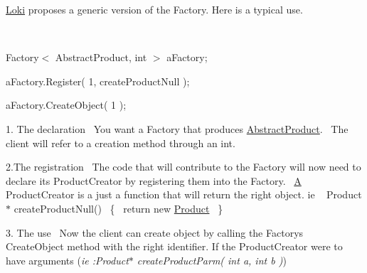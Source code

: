 \hyperlink{namespaceLoki}{Loki} proposes a generic version of the Factory. Here is a typical use.~\newline
 {\ttfamily ~\newline

\begin{DoxyEnumerate}
\item Factory$<$ Abstract\+Product, int $>$ a\+Factory;~\newline

\item a\+Factory.\+Register( 1, create\+Product\+Null );~\newline

\item a\+Factory.\+Create\+Object( 1 ); ~\newline
 ~\newline
 ~\newline

\end{DoxyEnumerate}
\begin{DoxyItemize}
\item 1. The declaration~\newline
 You want a Factory that produces \hyperlink{classAbstractProduct}{Abstract\+Product}.~\newline
 The client will refer to a creation method through an int.~\newline

\item 2.\+The registration~\newline
 The code that will contribute to the Factory will now need to declare its Product\+Creator by registering them into the Factory.~\newline
 \hyperlink{structA}{A} Product\+Creator is a just a function that will return the right object. ie ~\newline
 {\ttfamily  Product$\ast$ create\+Product\+Null()~\newline
 \{~\newline
 return new \hyperlink{classProduct}{Product}~\newline
 \}~\newline
 }~\newline

\item 3. The use~\newline
 Now the client can create object by calling the Factory\textquotesingle{}s Create\+Object method with the right identifier. If the Product\+Creator were to have arguments ({\itshape ie \+:Product$\ast$ create\+Product\+Parm( int a, int b )}) 
\end{DoxyItemize}}